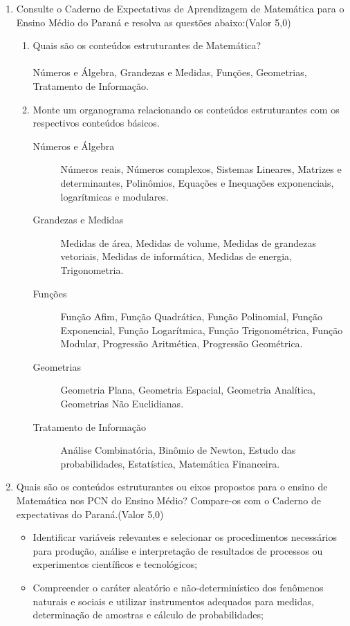 \documentclass[a4paper, 12pt]{article}
\begin{document}
\begin{enumerate}
\item Consulte o Caderno de Expectativas de Aprendizagem de Matemática para o Ensino Médio do Paraná e resolva as questões abaixo:(Valor 5,0)
  \begin{enumerate}
  \item Quais são os conteúdos estruturantes de Matemática?\\\\
    Números e Álgebra, Grandezas e Medidas, Funções, Geometrias, Tratamento de Informação.    
  \item Monte um organograma relacionando os conteúdos estruturantes com os respectivos conteúdos básicos.
    \begin{description}
    \item[Números e Álgebra] Números reais, Números complexos, Sistemas Lineares, Matrizes e determinantes, Polinômios, Equações e Inequações exponenciais, logarítmicas e modulares.
    \item[Grandezas e Medidas] Medidas de área, Medidas de volume, Medidas de grandezas vetoriais, Medidas de informática, Medidas de energia, Trigonometria.
    \item[Funções] Função Afim, Função Quadrática, Função Polinomial, Função Exponencial, Função Logarítmica, Função Trigonométrica, Função Modular, Progressão Aritmética, Progressão Geométrica.
    \item[Geometrias] Geometria Plana, Geometria Espacial, Geometria Analítica, Geometrias Não Euclidianas.
    \item[Tratamento de Informação] Análise Combinatória, Binômio de Newton, Estudo das probabilidades, Estatística, Matemática Financeira.
    \end{description}
  \end{enumerate}
\item Quais são os conteúdos estruturantes ou eixos propostos para o ensino de Matemática nos PCN do Ensino Médio? Compare-os com o Caderno de expectativas do Paraná.(Valor 5,0)\\
  \begin{itemize}
  \item  Identificar variáveis relevantes e selecionar os procedimentos necessários para produção, análise e interpretação de resultados de processos ou experimentos científicos e tecnológicos;
  \item  Compreender o caráter aleatório e não-determinístico dos fenômenos naturais e sociais e utilizar instrumentos adequados para medidas, determinação de amostras e cálculo de probabilidades;

\end{itemize}
\end{enumerate}
\end{document}
